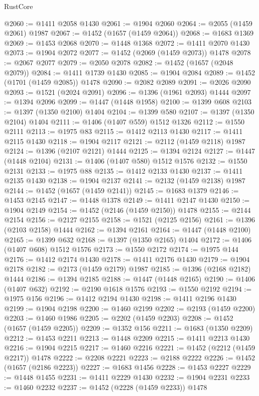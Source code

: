 \begin{lexlean}{RustCore}
\begin{coremodule}
@2060 := @1411 @2058 @1430
@2061 := @1904 @2060
@2064 := @2055 (@1459 @2061) @1987
@2067 := @1452 (@1657 (@1459 @2064))
@2068 := @1683 @1369
@2069 := @1453 @2068
@2070 := @1448 @1368
@2072 := @1411 @2070 @1430
@2073 := @1904 @2072
@2077 := @1452 (@2069 (@1459 @2073)) @1478
@2078 := @2067 @2077
@2079 := @2050 @2078
@2082 := @1452 (@1657 (@2048 @2079))
@2084 := @1411 @1739 @1430
@2085 := @1904 @2084
@2089 := @1452 (@1701 (@1459 @2085)) @1478
@2090 := @2082 @2089
@2091 := @2026 @2090
@2093 := @1521 (@2024 @2091)
@2096 := @1396 (@1961 @2093) @1444
@2097 := @1394 @2096
@2099 := @1447 (@1448 @1958)
@2100 := @1399 @608
@2103 := @1397 (@1350 @2100) @1404
@2104 := @1399 @580
@2107 := @1397 (@1350 @2104) @1404
@2111 := @1406 (@1407 @559) @1512 @1326
@2112 := @1550 @2111
@2113 := @1975 @83
@2115 := @1412 @2113 @1430
@2117 := @1411 @2115 @1430
@2118 := @1904 @2117
@2121 := @2112 (@1459 @2118) @1987
@2124 := @1396 (@2107 @2121) @1444
@2125 := @1394 @2124
@2127 := @1447 (@1448 @2104)
@2131 := @1406 (@1407 @580) @1512 @1576
@2132 := @1550 @2131
@2133 := @1975 @88
@2135 := @1412 @2133 @1430
@2137 := @1411 @2135 @1430
@2138 := @1904 @2137
@2141 := @2132 (@1459 @2138) @1987
@2144 := @1452 (@1657 (@1459 @2141))
@2145 := @1683 @1379
@2146 := @1453 @2145
@2147 := @1448 @1378
@2149 := @1411 @2147 @1430
@2150 := @1904 @2149
@2154 := @1452 (@2146 (@1459 @2150)) @1478
@2155 := @2144 @2154
@2156 := @2127 @2155
@2158 := @1521 (@2125 @2156)
@2161 := @1396 (@2103 @2158) @1444
@2162 := @1394 @2161
@2164 := @1447 (@1448 @2100)
@2165 := @1399 @632
@2168 := @1397 (@1350 @2165) @1404
@2172 := @1406 (@1407 @608) @1512 @1576
@2173 := @1550 @2172
@2174 := @1975 @144
@2176 := @1412 @2174 @1430
@2178 := @1411 @2176 @1430
@2179 := @1904 @2178
@2182 := @2173 (@1459 @2179) @1987
@2185 := @1396 (@2168 @2182) @1444
@2186 := @1394 @2185
@2188 := @1447 (@1448 @2165)
@2190 := @1406 (@1407 @632)
@2192 := @2190 @1618 @1576
@2193 := @1550 @2192
@2194 := @1975 @156
@2196 := @1412 @2194 @1430
@2198 := @1411 @2196 @1430
@2199 := @1904 @2198
@2200 := @1460 @2199
@2202 := @2193 (@1459 @2200)
@2203 := @1460 @1986
@2205 := @2202 (@1459 @2203)
@2208 := @1452 (@1657 (@1459 @2205))
@2209 := @1352 @156
@2211 := @1683 (@1350 @2209)
@2212 := @1453 @2211
@2213 := @1448 @2209
@2215 := @1411 @2213 @1430
@2216 := @1904 @2215
@2217 := @1460 @2216
@2221 := @1452 (@2212 (@1459 @2217)) @1478
@2222 := @2208 @2221
@2223 := @2188 @2222
@2226 := @1452 (@1657 (@2186 @2223))
@2227 := @1683 @1456
@2228 := @1453 @2227
@2229 := @1448 @1455
@2231 := @1411 @2229 @1430
@2232 := @1904 @2231
@2233 := @1460 @2232
@2237 := @1452 (@2228 (@1459 @2233)) @1478

\end{coremodule}
\end{lexlean}
